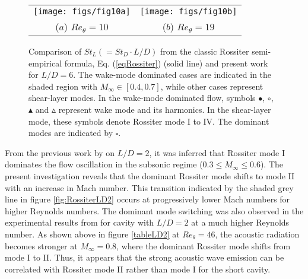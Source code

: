 \documentclass{jfm}
\begin{document}
\begin{figure}
\begin{center}
  \begin{tabular}{cc}
   \vspace{-0.1in}\texttt{[image: figs/fig10a]} & \texttt{[image: figs/fig10b]}\\
   ($a$) $Re_\theta=10$ & ($b$) $Re_\theta = 19$
     \end{tabular}
   \caption{Comparison of $St_L (=St_D \cdot L/D)$ from the classic Rossiter semi-empirical formula, Eq. (\ref{eqRossiter}) (solid line) and present work for $L/D=6$. The wake-mode dominated cases are indicated in the shaded region with $M_\infty \in[0.4,0.7]$, while other cases represent shear-layer modes. In the wake-mode dominated flow, symbols $\bullet$, $\circ$, $\blacktriangle$ and $\vartriangle$ represent wake mode and its harmonics. In the shear-layer mode, these symbols denote Rossiter mode I to IV.  The dominant modes are indicated by $\square$. }
   \label{fig:RossiterLD6} 
\end{center}
\end{figure}

From the previous work by \cite{Bres:2007} on $L/D=2$, it was inferred that Rossiter mode I dominates the flow oscillation in the subsonic regime ($0.3\le M_\infty \le0.6$). The present investigation reveals that the dominant Rossiter mode shifts to mode II with an increase in Mach number. This transition indicated by the shaded grey line in figure \ref{fig:RossiterLD2} occurs at progressively lower Mach numbers for higher Reynolds numbers. The dominant mode switching was also observed in the experimental results from \cite{Kegerise:04PF} for cavity with $L/D=2$ at a much higher Reynolds number. As shown above in figure \ref{tableLD2} at $Re_\theta=46$, the acoustic radiation becomes stronger at $M_\infty=0.8$, where the dominant Rossiter mode shifts from mode I to II. Thus, it appears that the strong acoustic wave emission can be correlated with Rossiter mode II rather than mode I for the short cavity.
\end{document}
